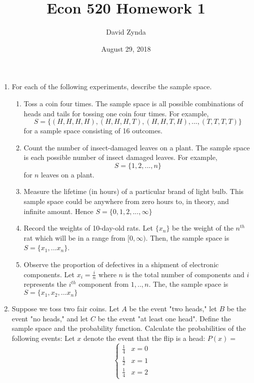 \documentclass[12pt, letterpaper]{article}
\title{Econ 520 Homework 1}
\author{David Zynda}
\date{August 29, 2018}
\begin{document}
\maketitle
 \begin{enumerate}

	 \item  For each of the following experiments, describe the sample space. 
		 \begin{enumerate}
			 \item Toss a coin four times.\hfill \break 
				The sample space is all possible combinations of heads and tails for tossing one coin four times. For example, $$S = \{(H,H,H,H), (H,H,H,T), (H,H,T,H), ..., (T,T,T,T)\}$$ for a sample space consisting of 16 outcomes. 
			 \item Count the number of insect-damaged leaves on a plant. 
				\hfill \break
				The sample space is each possible number of insect damaged leaves. For example, $$S = \{1,2,...,n\}$$ for $n$ leaves on a plant. 
			 \item Measure the lifetime (in hours) of a particular brand of light bulb.
				\hfill \break 
				 This sample space could be anywhere from zero hours to, in theory, and infinite amount. Hence $S = \{0,1,2,...,\infty\}$
			 \item Record the weights of 10-day-old rats. 
				 \hfill \break
				 Let $\{x_n\}$ be the weight of the $n^{th}$ rat which will be in a range from $[0,\infty)$. Then, the sample space is $S = \{x_1, ... x_n\}$. 
			 \item Observe the proportion of defectives in a shipment of electronic components.
				 \hfill \break
				 Let $x_i = \frac{i}{n}$ where $n$ is the total number of components and $i$ represents the $i^{th}$ component from $1,..,n$. The, the sample space is $S = \{x_1, x_2, ... x_n\}$
		 \end{enumerate}
	 \item Suppose we toss two fair coins. Let $A$ be the event "two heads," let $B$ be the event "no heads," and let $C$ be the event "at least one head". Define the sample space and the probability function. Calculate the probabilities of the following events: \hfill \break
	Let $x$ denote the event that the flip is a head:
		 $P(x) = $
		 \[ \begin{cases}
			 \frac{1}{4} & x = 0 \\
			 \frac{1}{2} & x = 1 \\
			 \frac{1}{4} & x = 2 
		\end{cases}
		 \]


\end{enumerate}
\end{document}

